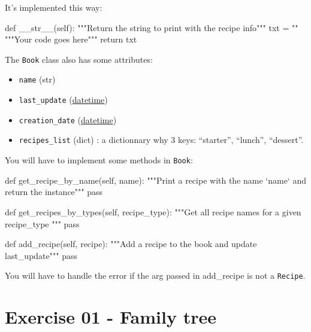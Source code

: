 \documentclass[]{article}
\newenvironment{Shaded}{\begin{snugshade}}{\end{snugshade}}
\newcommand{\CommentTok}[1]{\textcolor[rgb]{0.48,0.49,0.49}{#1}}
\newcommand{\ControlFlowTok}[1]{\textcolor[rgb]{0.99,0.74,0.29}{#1}}
\newcommand{\FunctionTok}[1]{\textcolor[rgb]{0.56,0.27,0.68}{#1}}
\newcommand{\KeywordTok}[1]{\textcolor[rgb]{0.81,0.81,0.76}{#1}}
\newcommand{\NormalTok}[1]{\textcolor[rgb]{0.81,0.81,0.76}{#1}}
\newcommand{\OperatorTok}[1]{\textcolor[rgb]{0.81,0.81,0.76}{#1}}
\newcommand{\StringTok}[1]{\textcolor[rgb]{0.96,0.31,0.31}{#1}}
\newcommand{\VariableTok}[1]{\textcolor[rgb]{0.15,0.68,0.68}{#1}}
\begin{document}
It's implemented this way:

\begin{Shaded}
\begin{Highlighting}[]
\KeywordTok{def} \FunctionTok{__str__}\NormalTok{(}\VariableTok{self}\NormalTok{):}
    \CommentTok{"""Return the string to print with the recipe info"""}
\NormalTok{    txt }\OperatorTok{=} \StringTok{""}
    \CommentTok{"""Your code goes here"""}
    \ControlFlowTok{return}\NormalTok{ txt}
\end{Highlighting}
\end{Shaded}

The \texttt{Book} class also has some attributes:

\begin{itemize}
\item
  \texttt{name} (str)
\item
  \texttt{last\_update}
  (\href{https://docs.python.org/3/library/datetime.html}{datetime})
\item
  \texttt{creation\_date}
  (\href{https://docs.python.org/3/library/datetime.html}{datetime})
\item
  \texttt{recipes\_list} (dict) : a dictionnary why 3 keys: ``starter'',
  ``lunch'', ``dessert''.
\end{itemize}

You will have to implement some methods in \texttt{Book}:

\begin{Shaded}
\begin{Highlighting}[]
\KeywordTok{def}\NormalTok{ get_recipe_by_name(}\VariableTok{self}\NormalTok{, name):}
    \CommentTok{"""Print a recipe with the name `name` and return the instance"""}
    \ControlFlowTok{pass}

\KeywordTok{def}\NormalTok{ get_recipes_by_types(}\VariableTok{self}\NormalTok{, recipe_type):}
    \CommentTok{"""Get all recipe names for a given recipe_type """}
    \ControlFlowTok{pass}

\KeywordTok{def}\NormalTok{ add_recipe(}\VariableTok{self}\NormalTok{, recipe):}
    \CommentTok{"""Add a recipe to the book and update last_update"""}
    \ControlFlowTok{pass}
\end{Highlighting}
\end{Shaded}

You will have to handle the error if the arg passed in add\_recipe is
not a \texttt{Recipe}.

\clearpage

\hypertarget{exercise-01---family-tree-1}{%
\section{Exercise 01 - Family tree}\label{exercise-01---family-tree-1}}
\end{document}
